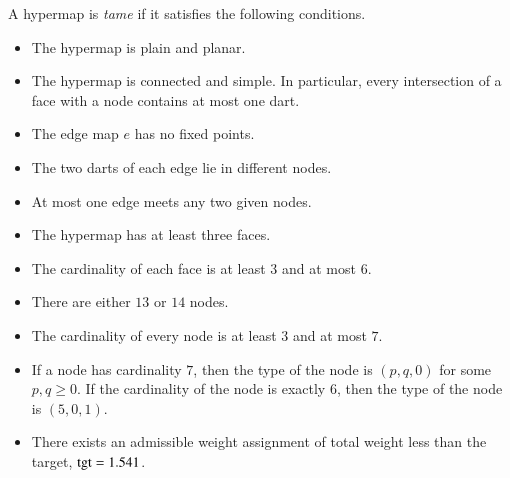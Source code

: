 A hypermap is {\it tame\/} if it satisfies the following conditions.
%

\begin{itemize}
    \label{definition:tame}
    \item {}  The hypermap is plain and planar.
    \item {} The hypermap is connected and simple.  In particular, every intersection of a face with a node contains at most one dart.
    \item {} The edge map $e$ has no fixed points.
    \item {} The two darts of each edge lie in different nodes.
    \item {} At most one edge meets any two given nodes.
%
  \item {} The hypermap has at least three faces.
    \item {} The cardinality of each face is at least $3$ and at most $6$.
    \item {} There are either $13$ or $14$ nodes.
    \item {} The cardinality of every node is at least $3$ and at most
    $7$.
    \item {} If a node has cardinality $7$, then the type of the
       node is $(p,q,0)$ for some $p,q\ge0$.   If the
        cardinality of the node is exactly $6$, then the type of the node
        is $(5,0,1)$.
    \item {} There exists an admissible weight assignment
        of total weight less than the target, ${\operatorname{tgt}}=1.541$.
\end{itemize}
%
%
%
%
%
%
%
%

